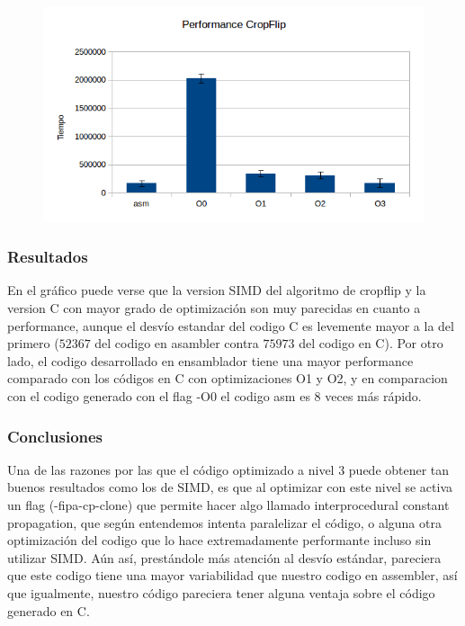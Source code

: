 \documentclass[a4paper]{article}
\begin{document}
\begin{figure}[h!]
  \begin{center}
	\includegraphics[scale=0.66]{Graficos1.4/crop/per.jpg}
	\label{nombreparareferenciar5}
  \end{center}
\end{figure}

\subsubsection{Resultados}

En el gráfico puede verse que la version SIMD del algoritmo de cropflip  y la version C con mayor grado de optimización son muy parecidas en cuanto a performance, aunque el desvío estandar del codigo C es levemente mayor a la del primero ($52367$ del codigo en asambler contra $75973$ del codigo en C). Por otro lado, el codigo desarrollado en ensamblador tiene una mayor performance comparado con los códigos en C con optimizaciones O1 y O2, y en comparacion con el codigo generado con el flag -O0 el codigo asm es 8 veces más rápido.

\subsubsection{Conclusiones}
Una de las razones por las que el código optimizado a nivel 3 puede obtener tan buenos resultados como los de SIMD, es que al optimizar con este nivel se activa un flag (-fipa-cp-clone) que permite hacer algo llamado interprocedural constant propagation, que según entendemos intenta paralelizar el código, o alguna otra optimización del codigo que lo hace extremadamente performante incluso sin utilizar SIMD. Aún así, prestándole más atención al desvío estándar, pareciera que este codigo tiene una mayor variabilidad que nuestro codigo en assembler, así que igualmente, nuestro código pareciera tener alguna ventaja sobre el código generado en C.
\end{document}
